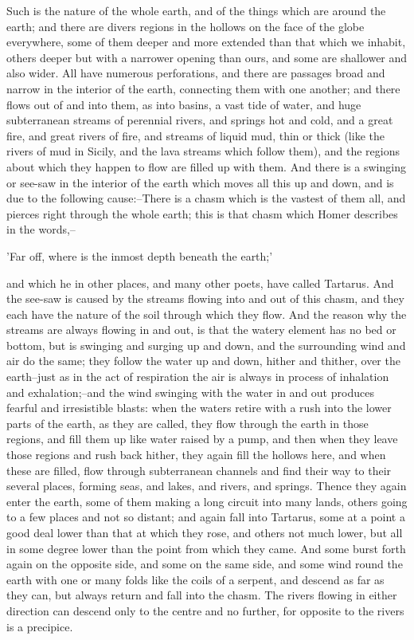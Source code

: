 Such is the nature of the whole earth, and of the things which are
around the earth; and there are divers regions in the hollows on the
face of the globe everywhere, some of them deeper and more extended than
that which we inhabit, others deeper but with a narrower opening
than ours, and some are shallower and also wider. All have numerous
perforations, and there are passages broad and narrow in the interior of
the earth, connecting them with one another; and there flows out of and
into them, as into basins, a vast tide of water, and huge subterranean
streams of perennial rivers, and springs hot and cold, and a great fire,
and great rivers of fire, and streams of liquid mud, thin or thick (like
the rivers of mud in Sicily, and the lava streams which follow them),
and the regions about which they happen to flow are filled up with them.
And there is a swinging or see-saw in the interior of the earth which
moves all this up and down, and is due to the following cause:--There is
a chasm which is the vastest of them all, and pierces right through the
whole earth; this is that chasm which Homer describes in the words,--

     'Far off, where is the inmost depth beneath the earth;'

and which he in other places, and many other poets, have called
Tartarus. And the see-saw is caused by the streams flowing into and out
of this chasm, and they each have the nature of the soil through which
they flow. And the reason why the streams are always flowing in and out,
is that the watery element has no bed or bottom, but is swinging and
surging up and down, and the surrounding wind and air do the same; they
follow the water up and down, hither and thither, over the earth--just
as in the act of respiration the air is always in process of inhalation
and exhalation;--and the wind swinging with the water in and out
produces fearful and irresistible blasts: when the waters retire with
a rush into the lower parts of the earth, as they are called, they flow
through the earth in those regions, and fill them up like water raised
by a pump, and then when they leave those regions and rush back hither,
they again fill the hollows here, and when these are filled, flow
through subterranean channels and find their way to their several
places, forming seas, and lakes, and rivers, and springs. Thence they
again enter the earth, some of them making a long circuit into many
lands, others going to a few places and not so distant; and again fall
into Tartarus, some at a point a good deal lower than that at which they
rose, and others not much lower, but all in some degree lower than the
point from which they came. And some burst forth again on the opposite
side, and some on the same side, and some wind round the earth with one
or many folds like the coils of a serpent, and descend as far as they
can, but always return and fall into the chasm. The rivers flowing in
either direction can descend only to the centre and no further, for
opposite to the rivers is a precipice.

